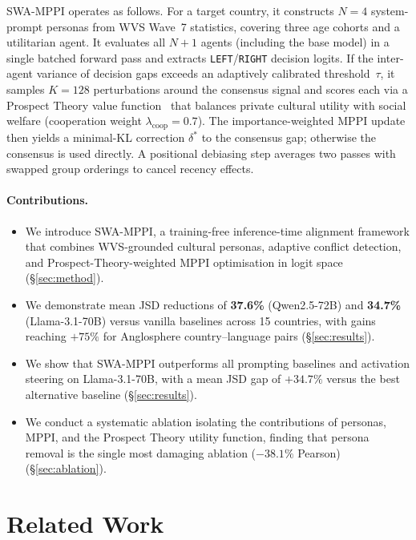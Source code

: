 \documentclass{article}
\begin{document}
SWA-MPPI operates as follows. For a target country, it constructs $N=4$ system-prompt
personas from WVS Wave~7 statistics, covering three age cohorts and a utilitarian agent.
It evaluates all $N+1$ agents (including the base model) in a single batched forward pass
and extracts \texttt{LEFT}/\texttt{RIGHT} decision logits. If the inter-agent variance of
decision gaps exceeds an adaptively calibrated threshold~$\tau$, it samples $K=128$
perturbations around the consensus signal and scores each via a Prospect Theory value
function~\citep{kahneman1979prospect} that balances private cultural utility with social
welfare (cooperation weight $\lambda_{\text{coop}}=0.7$). The importance-weighted MPPI
update then yields a minimal-KL correction $\delta^*$ to the consensus gap; otherwise the
consensus is used directly. A positional debiasing step averages two passes with
swapped group orderings to cancel recency effects.

\paragraph{Contributions.}
\begin{itemize}
  \item We introduce SWA-MPPI, a training-free inference-time alignment framework that
        combines WVS-grounded cultural personas, adaptive conflict detection, and
        Prospect-Theory-weighted MPPI optimisation in logit space (\S\ref{sec:method}).
  \item We demonstrate mean JSD reductions of \textbf{37.6\%} (Qwen2.5-72B) and
        \textbf{34.7\%} (Llama-3.1-70B) versus vanilla baselines across 15 countries,
        with gains reaching $+75\%$ for Anglosphere country--language pairs
        (\S\ref{sec:results}).
  \item We show that SWA-MPPI outperforms all prompting baselines and activation
        steering on Llama-3.1-70B, with a mean JSD gap of $+34.7\%$ versus the best
        alternative baseline (\S\ref{sec:results}).
  \item We conduct a systematic ablation isolating the contributions of personas, MPPI,
        and the Prospect Theory utility function, finding that persona removal is the
        single most damaging ablation ($-38.1\%$ Pearson) (\S\ref{sec:ablation}).
\end{itemize}

\section{Related Work}
\label{sec:related}
\end{document}
